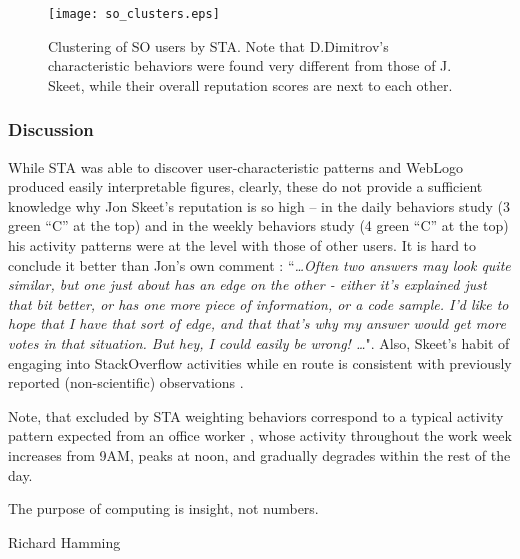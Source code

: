 \begin{figure}[t]
   \centering
   \texttt{[image: so\_clusters.eps]}
   \caption{Clustering of SO users by STA. Note that D.Dimitrov's characteristic behaviors were found very different from those of J. Skeet, while their overall reputation scores are next to each other.}
   \label{fig:stack_clusters}   
\end{figure}

\subsubsection{Discussion}
While STA was able to discover user-characteristic patterns and WebLogo produced easily interpretable figures, clearly, these do not provide a sufficient knowledge why Jon Skeet's reputation is so high -- in the daily behaviors study (3 green ``C'' at the top) and in the weekly behaviors study (4 green ``C'' at the top) his activity patterns were at the level with those of other users. It is hard to conclude it better than Jon's own comment \cite{skeet}: ``\textit{\dots Often two answers may look quite similar, but one just about has an edge on the other - either it's explained just that bit better, or has one more piece of information, or a code sample. I'd like to hope that I have that sort of edge, and that that's why my answer would get more votes in that situation. But hey, I could easily be wrong! \dots}". Also, Skeet's habit of engaging into StackOverflow activities while en route is consistent with previously reported (non-scientific) observations \cite{tharp_habit}.

Note, that excluded by STA weighting behaviors correspond to a typical activity pattern expected from an office worker \cite{activity_patterns}, whose activity throughout the work week increases from 9AM, peaks at noon, and gradually degrades within the rest of the day.


\epigraph{The purpose of computing is insight, not numbers.}{Richard Hamming}
